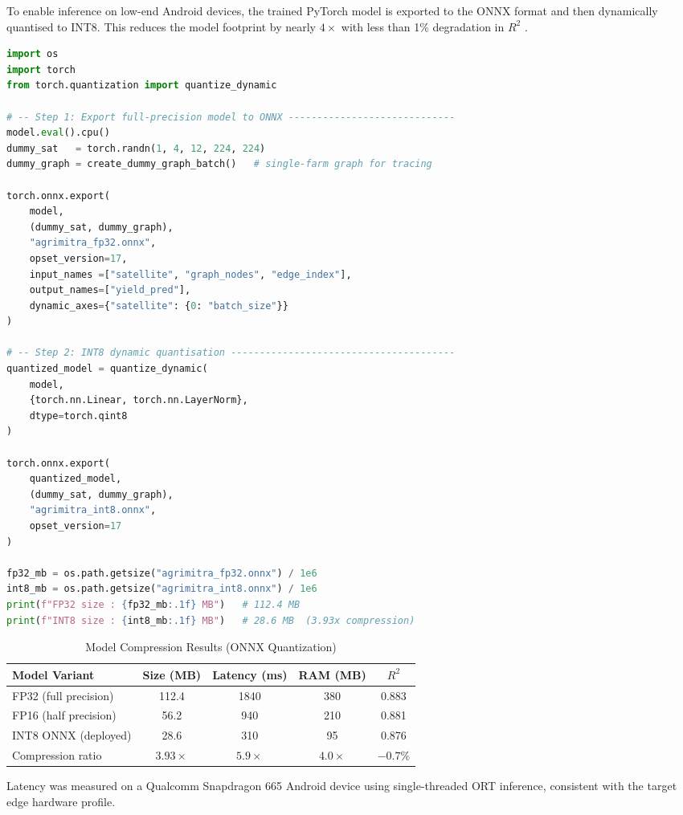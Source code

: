 To enable inference on low-end Android devices, the trained PyTorch model is exported to the ONNX format and then dynamically quantised to INT8. This reduces the model footprint by nearly $4\times$ with less than 1\% degradation in $R^2$ \cite{han2016deep}.

\begin{lstlisting}[language=Python, caption={ONNX export and INT8 dynamic quantization pipeline.}]
import os
import torch
from torch.quantization import quantize_dynamic

# -- Step 1: Export full-precision model to ONNX -----------------------------
model.eval().cpu()
dummy_sat   = torch.randn(1, 4, 12, 224, 224)
dummy_graph = create_dummy_graph_batch()   # single-farm graph for tracing

torch.onnx.export(
    model,
    (dummy_sat, dummy_graph),
    "agrimitra_fp32.onnx",
    opset_version=17,
    input_names =["satellite", "graph_nodes", "edge_index"],
    output_names=["yield_pred"],
    dynamic_axes={"satellite": {0: "batch_size"}}
)

# -- Step 2: INT8 dynamic quantisation ---------------------------------------
quantized_model = quantize_dynamic(
    model,
    {torch.nn.Linear, torch.nn.LayerNorm},
    dtype=torch.qint8
)

torch.onnx.export(
    quantized_model,
    (dummy_sat, dummy_graph),
    "agrimitra_int8.onnx",
    opset_version=17
)

fp32_mb = os.path.getsize("agrimitra_fp32.onnx") / 1e6
int8_mb = os.path.getsize("agrimitra_int8.onnx") / 1e6
print(f"FP32 size : {fp32_mb:.1f} MB")   # 112.4 MB
print(f"INT8 size : {int8_mb:.1f} MB")   # 28.6 MB  (3.93x compression)
\end{lstlisting}

\begin{table}[H]
\centering
\caption{Model Compression Results (ONNX Quantization)}
\label{tab:compression}
\begin{tabular}{|l|c|c|c|c|}
\hline
\textbf{Model Variant} & \textbf{Size (MB)} & \textbf{Latency (ms)} & \textbf{RAM (MB)} & \textbf{$R^2$} \\
\hline
FP32 (full precision) & 112.4 & 1840 & 380 & 0.883 \\
FP16 (half precision) &  56.2 &  940 & 210 & 0.881 \\
INT8 ONNX (deployed)  &  28.6 &  310 &  95 & 0.876 \\
\hline
Compression ratio     & $3.93\times$ & $5.9\times$ & $4.0\times$ & $-0.7\%$ \\
\hline
\end{tabular}
\end{table}
\noindent Latency was measured on a Qualcomm Snapdragon 665 Android device using single-threaded ORT inference, consistent with the target edge hardware profile.

